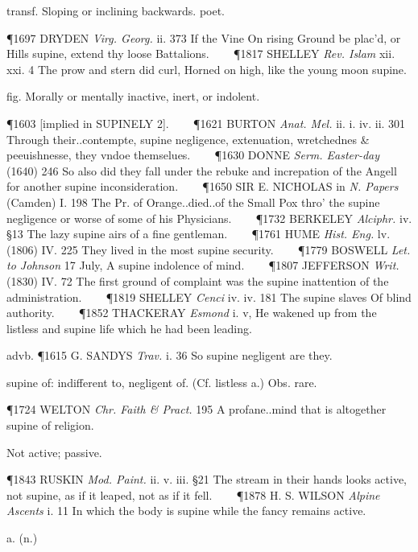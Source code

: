 \begin{description}[wide, labelwidth=!, labelindent=0pt]
\begin{myenumerate}
 transf. Sloping or inclining backwards. poet.

\P 1697 DRYDEN  \textit{Virg. Georg.} ii. 373 If the Vine On rising Ground be plac'd, or Hills supine, extend thy loose Battalions.    
\P 1817 SHELLEY  \textit{Rev. Islam} xii. xxi. 4 The prow and stern did curl, Horned on high, like the young moon supine.

 fig. Morally or mentally inactive, inert, or indolent.

\P 1603 [implied in  SUPINELY 2].    
\P 1621 BURTON  \textit{Anat. Mel.} ii. i. iv. ii. 301 Through their..contempte, supine negligence, extenuation, wretchednes \& peeuishnesse, they vndoe themselues.    
\P 1630 DONNE  \textit{Serm. Easter-day} (1640) 246 So also did they fall under the rebuke and increpation of the Angell for another supine inconsideration.    
\P 1650 SIR E. NICHOLAS in \textit{N. Papers} (Camden) I. 198 The Pr. of Orange..died..of the Small Pox thro' the supine negligence or worse of some of his Physicians.    
\P 1732 BERKELEY  \textit{Alciphr.} iv. §13 The lazy supine airs of a fine gentleman.    
\P 1761 HUME  \textit{Hist. Eng.} lv. (1806) IV. 225 They lived in the most supine security.    
\P 1779 BOSWELL  \textit{Let. to Johnson} 17 July, A supine indolence of mind.    
\P 1807 JEFFERSON  \textit{Writ.} (1830) IV. 72 The first ground of complaint was the supine inattention of the administration.    
\P 1819 SHELLEY  \textit{Cenci} iv. iv. 181 The supine slaves Of blind authority.    
\P 1852 THACKERAY  \textit{Esmond} i. v, He wakened up from the listless and supine life which he had been leading.

advb. \P 1615 G. SANDYS  \textit{Trav.} i. 36 So supine negligent are they.

 supine of: indifferent to, negligent of. (Cf. listless a.) Obs. rare.

\P 1724 WELTON  \textit{Chr. Faith \& Pract.} 195 A profane..mind that is altogether supine of religion.

 Not active; passive.

\P 1843 RUSKIN  \textit{Mod. Paint.} ii. v. iii. §21 The stream in their hands looks active, not supine, as if it leaped, not as if it fell.    
\P 1878 H. S. WILSON  \textit{Alpine Ascents} i. 11 In which the body is supine while the fancy remains active.
\end{myenumerate}


 a. (n.)


\end{description}
